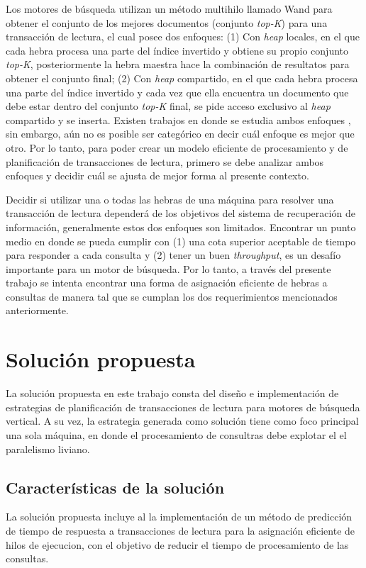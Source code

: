 Los motores de búsqueda utilizan un método multihilo llamado Wand para obtener el conjunto de los mejores documentos (conjunto \textit{top-K}) para una transacción de lectura, el cual posee dos enfoques: (1) Con \textit{heap} locales, en el que cada hebra procesa una parte del índice invertido y obtiene su propio conjunto \textit{top-K}, posteriormente la hebra maestra hace la combinación de resultatos para obtener el conjunto final; (2) Con \textit{heap} compartido, en el que cada hebra procesa una parte del índice invertido y cada vez que ella encuentra un documento que debe estar dentro del conjunto \textit{top-K} final, se pide acceso exclusivo al \textit{heap} compartido y se inserta. Existen trabajos en donde se estudia ambos enfoques \citep{Rojas:2013}, sin embargo, aún no es posible ser categórico en decir cuál enfoque es mejor que otro. Por lo tanto, para poder crear un modelo eficiente de procesamiento y de planificación de transacciones de lectura, primero se debe analizar ambos enfoques y decidir cuál se ajusta de mejor forma al presente contexto.

Decidir si utilizar una o todas las hebras de una máquina para resolver una transacción de lectura dependerá de los objetivos del sistema de recuperación de información, generalmente estos dos enfoques son limitados. Encontrar un punto medio en donde se pueda cumplir con (1) una cota superior aceptable de tiempo para responder a cada consulta y (2) tener un buen \textit{throughput}, es un desafío importante para un motor de búsqueda. Por lo tanto, a través del presente trabajo se intenta encontrar una forma de asignación eficiente de hebras a consultas de manera tal que se cumplan los dos requerimientos mencionados anteriormente. 


\section{Solución propuesta}
\label{intro:solucionpropuesta}
La solución propuesta en este trabajo consta del diseño e implementación de estrategias de planificación de transacciones de lectura para motores de búsqueda vertical. A su vez, la estrategia generada como solución tiene como foco principal una sola máquina, en donde el procesamiento de consultras debe explotar el el paralelismo liviano. 


\subsection{Caracter\'isticas de la solución}
\label{intro:caracteristicassolucion}
La solución propuesta incluye al la implementación de un método de predicción de tiempo de respuesta a transacciones de lectura para la asignación eficiente de hilos de ejecucion, con el objetivo de reducir el tiempo de procesamiento de las consultas. 

